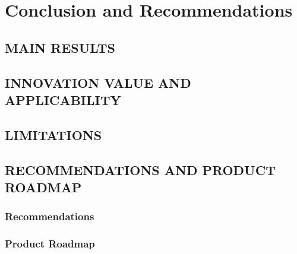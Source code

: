\chapter{Conclusion and Recommendations}

\section{MAIN RESULTS}
\section{INNOVATION VALUE AND APPLICABILITY}
\section{LIMITATIONS}
\section{RECOMMENDATIONS AND PRODUCT ROADMAP}
\subsection{Recommendations}
\subsection{Product Roadmap}
